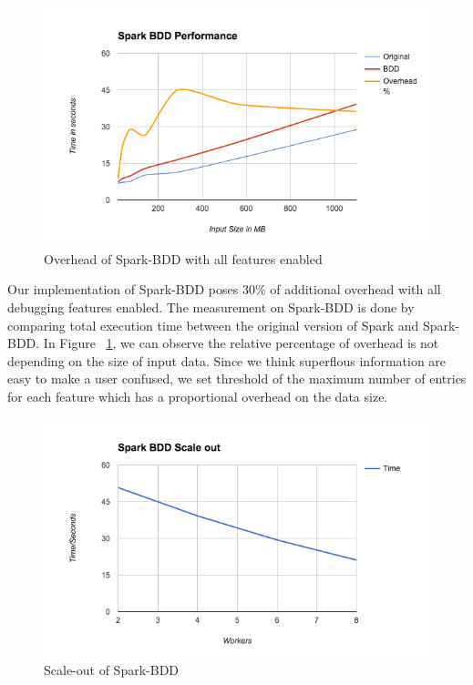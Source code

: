 \documentclass{acm_proc_article-sp}
\begin{document}
\begin{figure}[ht]
    \begin{minipage}[b]{\linewidth}
        \includegraphics[width=\textwidth]{spark-bdd-performance.png}
        \caption{Overhead of Spark-BDD with all features enabled}
        \label{fig:overhead}
    \end{minipage}
\end{figure}
Our implementation of Spark-BDD poses 30\% of additional overhead with all debugging features enabled. The measurement on Spark-BDD is done by comparing total execution time between the original version of Spark and Spark-BDD. In Figure ~\ref{fig:overhead}, we can observe the relative percentage of overhead is not depending on the size of input data. Since we think superflous information are easy to make a user confused, we set threshold of the maximum number of entries for each feature which has a proportional overhead on the data size.\\
\begin{figure}[ht]
    \begin{minipage}[b]{\linewidth}
        \includegraphics[width=\textwidth]{spark-bdd-scale-out.png}
        \caption{Scale-out of Spark-BDD}
        \label{fig:scaleout}
    \end{minipage}
\end{figure}
\end{document}
